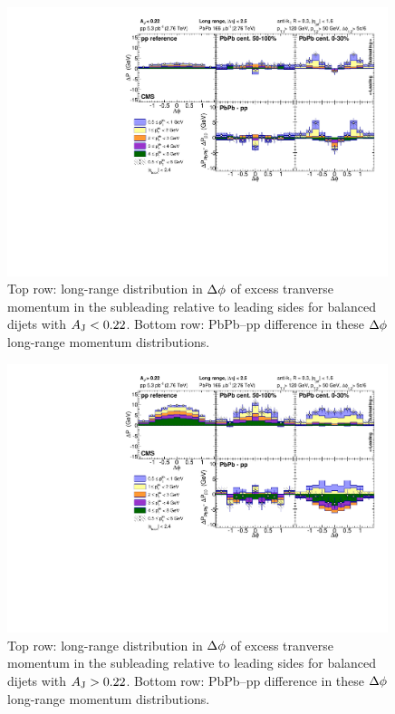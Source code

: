 \begin{figure}[hbt]
\begin{center} 
\includegraphics[width=0.99\textwidth]{figures/Results/Missing_pT_LongRange_Aj0_Aj22.pdf}
\caption[long-range subleading-to-leading momentum balance for balanced dijets]{Top row:  long-range distribution in $\protect\Delta\phi$ of excess tranverse momentum in the subleading relative to leading sides for balanced dijets with $A_{\rm J} < 0.22$.  Bottom row:  PbPb--pp difference in these $\protect\Delta\phi$ long-range momentum distributions.}
\label{fig:MpT_longrange_Aj0_Aj22} 
\end{center} 
\end{figure} 

\begin{figure}[hbt]
\begin{center} 
\includegraphics[width=0.99\textwidth]{figures/Results/Missing_pT_LongRange_Aj22_Aj75.pdf}
\caption[long-range subleading-to-leading momentum balance for unbalanced dijets]{Top row:  long-range distribution in $\protect\Delta\phi$ of excess tranverse momentum in the subleading relative to leading sides for balanced dijets with $A_{\rm J} > 0.22$.  Bottom row:  PbPb--pp difference in these $\protect\Delta\phi$ long-range momentum distributions.}
\label{fig:MpT_longrange_Aj22_Aj75} 
\end{center} 
\end{figure} 


